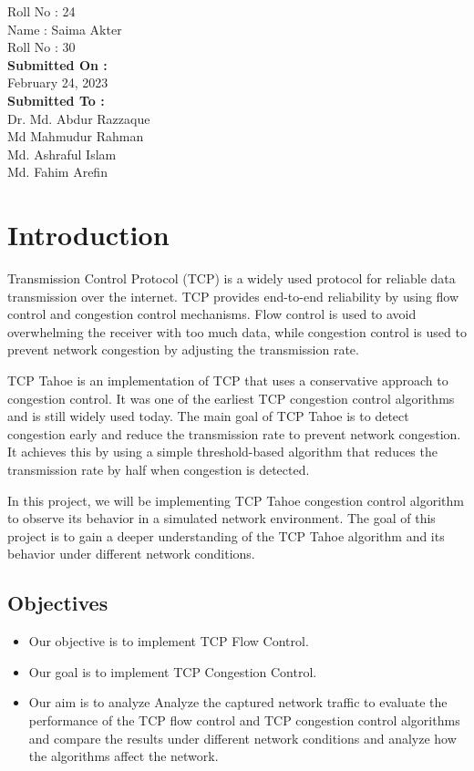 \documentclass[11pt]{article}
\begin{document}
\begin{titlepage}
\begin{large}
			Roll No : 24\\[12pt]
			Name : Saima Akter\\[8pt]
			Roll No : 30\\[12pt]
		\textbf{Submitted On : \\[12pt]}
			February 24, 2023\\[20pt]
		\textbf{Submitted To :\\[12pt]}
			Dr. Md. Abdur Razzaque\\[12pt]
                Md Mahmudur Rahman\\[12pt]
                Md. Ashraful Islam\\[12pt]
                Md. Fahim Arefin
	\end{large}
\end{titlepage}

\section{Introduction}
Transmission Control Protocol (TCP) is a widely used protocol for reliable data transmission over the internet. TCP provides end-to-end reliability by using flow control and congestion control mechanisms. Flow control is used to avoid overwhelming the receiver with too much data, while congestion control is used to prevent network congestion by adjusting the transmission rate.

TCP Tahoe is an implementation of TCP that uses a conservative approach to congestion control. It was one of the earliest TCP congestion control algorithms and is still widely used today. The main goal of TCP Tahoe is to detect congestion early and reduce the transmission rate to prevent network congestion. It achieves this by using a simple threshold-based algorithm that reduces the transmission rate by half when congestion is detected.

In this project, we will be implementing TCP Tahoe congestion control algorithm to observe its behavior in a simulated network environment. The goal of this project is to gain a deeper understanding of the TCP Tahoe algorithm and its behavior under different network conditions. 

\subsection{Objectives}
\begin{itemize}
    \item Our objective is to implement TCP Flow Control.
    
    \item Our goal is to implement TCP Congestion Control.

    \item Our aim is to analyze Analyze the captured network traffic to evaluate the performance of the TCP flow control and TCP congestion control algorithms and compare the results under different network conditions and analyze how the algorithms affect the network.
\end{itemize}
\end{document}
